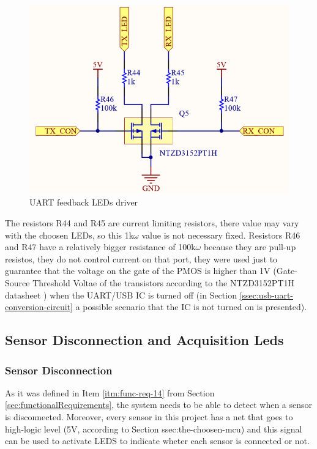		\begin{figure}[htbp]
			\centering
				\includegraphics[scale=1.3]{figuras/fig-leds-uart.png}
			\caption{UART feedback LEDs driver \cite{leds-uart}}
			\label{fig:leds-uart}
		\end{figure}

		The resistors R44 and R45 are current limiting resistors, there value may vary with the choosen LEDs, so this 1k$\omega$ value is not necessary fixed. Resistors R46 and R47 have a relatively bigger resistance of 100k$\omega$ because they are pull-up resistos, they do not control current on that port, they were used just to guarantee that the voltage on the gate of the PMOS is higher than 1V (Gate-Source Threshold Voltae of the transistors according to the NTZD3152PT1H datasheet \cite{ntzd3152pt1h-datasheet}) when the UART/USB IC is turned off (in Section \ref{ssec:usb-uart-conversion-circuit} a possible scenario that the IC is not turned on is presented).

	\subsection{Sensor Disconnection and Acquisition Leds}\label{ssec:sensor-disconnection-acquisition-leds}	

		\subsubsection{Sensor Disconnection}\label{sssec:sensor-disconnection-leds}

			As it was defined in Item \ref{itm:func-req-14} from Section \ref{sec:functionalRequirements}, the system needs to be able to detect when a sensor is disconnected. Moreover, every sensor in this project has a net that goes to high-logic level (5V, according to Section {ssec:the-choosen-mcu}) and this signal can be used to activate LEDS to indicate wheter each sensor is connected or not.


